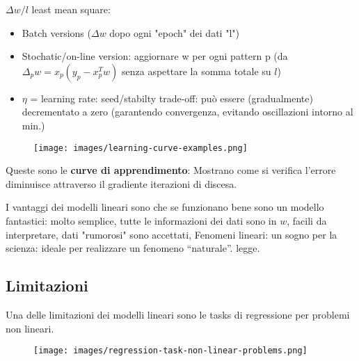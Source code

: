 $\Delta w/l$ least mean square:
\begin{itemize}
    \item Batch versions ($\Delta w$ dopo ogni "epoch" dei dati "l")
    \item Stochatic/on-line version: aggiornare w per ogni pattern p (da $\Delta_p w = x_p (y_p - x_p^T w)$ senza aspettare la somma totale su $l$)
    \item $\eta$ = learning rate: seed/stabilty trade-off: può essere (gradualmente) decrementato a zero (garantendo convergenza, 
    evitando oscillazioni intorno al min.)
\end{itemize}
\begin{figure}[h!]
    \centering
    \texttt{[image: images/learning-curve-examples.png]}
\end{figure}
\begin{definition}
    Queste sono le \textbf{curve di apprendimento}: Mostrano come si verifica l'errore diminuisce attraverso il gradiente iterazioni di discesa.
\end{definition}
I vantaggi dei modelli lineari sono che se funzionano bene sono un modello fantastici: molto semplice,
tutte le informazioni dei dati sono in $w$, facili da interpretare, dati "rumorosi" sono accettati, Fenomeni lineari: un sogno per la scienza: ideale per realizzare un fenomeno “naturale”.
legge.

\subsection{Limitazioni}
Una delle limitazioni dei modelli lineari sono le tasks di regressione per problemi non lineari.
\begin{figure}[h!]
    \centering
    \texttt{[image: images/regression-task-non-linear-problems.png]}
\end{figure}

